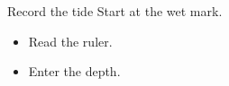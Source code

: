 \documentclass{beamer}
\begin{document}
\begin{frame}{Record the tide}
Start at the wet mark.\pause
\begin{itemize}
\item<2-> Read the ruler.
\item<3-> Enter the depth.
\end{itemize}
\end{frame}
\end{document}
